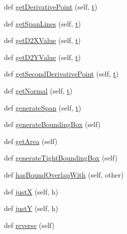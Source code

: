 \begin{DoxyCompactItemize}
\item 
def \hyperlink{classbezier_1_1_bezier_curve_a585ad6904fc86f56b6ab076d9e5631aa}{get\+Derivative\+Point} (self, \hyperlink{namespacebezier_a21309dd6a23cee0f4b3888de7b66b7ff}{t})
\item 
def \hyperlink{classbezier_1_1_bezier_curve_ac55cd30cbbcd12cf9ea5419ba2784e74}{get\+Span\+Lines} (self, \hyperlink{namespacebezier_a21309dd6a23cee0f4b3888de7b66b7ff}{t})
\item 
def \hyperlink{classbezier_1_1_bezier_curve_a023612963116656fc516654058647ef0}{get\+D2\+X\+Value} (self, \hyperlink{namespacebezier_a21309dd6a23cee0f4b3888de7b66b7ff}{t})
\item 
def \hyperlink{classbezier_1_1_bezier_curve_a9d170ca72ea731c0824ee1e8d2675893}{get\+D2\+Y\+Value} (self, \hyperlink{namespacebezier_a21309dd6a23cee0f4b3888de7b66b7ff}{t})
\item 
def \hyperlink{classbezier_1_1_bezier_curve_a1fc50ea3b49003eeb377d817a15e35ce}{get\+Second\+Derivative\+Point} (self, \hyperlink{namespacebezier_a21309dd6a23cee0f4b3888de7b66b7ff}{t})
\item 
def \hyperlink{classbezier_1_1_bezier_curve_a964b6692250b6c3e82276eab469af6ed}{get\+Normal} (self, \hyperlink{namespacebezier_a21309dd6a23cee0f4b3888de7b66b7ff}{t})
\item 
def \hyperlink{classbezier_1_1_bezier_curve_a28b0f5a264c1a37b4f38e3b4d9f44980}{generate\+Span} (self, \hyperlink{namespacebezier_a21309dd6a23cee0f4b3888de7b66b7ff}{t})
\item 
def \hyperlink{classbezier_1_1_bezier_curve_a2f6e9270634c92225ba306342c8a60d7}{generate\+Bounding\+Box} (self)
\item 
def \hyperlink{classbezier_1_1_bezier_curve_a56d4007381285ec7fa68041a146acc3a}{get\+Area} (self)
\item 
def \hyperlink{classbezier_1_1_bezier_curve_acaae994a33a9f9e41acb54f2691f1a86}{generate\+Tight\+Bounding\+Box} (self)
\item 
def \hyperlink{classbezier_1_1_bezier_curve_a67f06fd66567124f37eea60321e3126b}{has\+Bound\+Overlap\+With} (self, other)
\item 
def \hyperlink{classbezier_1_1_bezier_curve_a0d541f51c06e2cce9fb84515188d1fb3}{just\+X} (self, h)
\item 
def \hyperlink{classbezier_1_1_bezier_curve_aedc1b7ba039d659a32c37c323aa079b8}{just\+Y} (self, h)
\item 
def \hyperlink{classbezier_1_1_bezier_curve_a6a567a984fdaa79b45c34650d5806b1d}{reverse} (self)

\end{DoxyCompactItemize}
